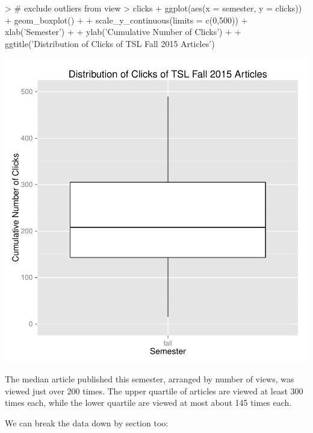 \documentclass[a4paper]{article}
\begin{document}
\begin{Schunk}
\begin{Sinput}
> # exclude outliers from view
> clicks %
+   ggplot(aes(x = semester, y = clicks)) + geom_boxplot() +
+   scale_y_continuous(limits = c(0,500)) + xlab('Semester') +
+   ylab('Cumulative Number of Clicks') +
+   ggtitle('Distribution of Clicks of TSL Fall 2015 Articles')
\end{Sinput}
\end{Schunk}
\includegraphics{FinalProject-025}


The median article published this semester, arranged by number of views, was viewed just over 200 times. The upper quartile of articles are viewed at least 300 times each, while the lower quartile are viewed at most about 145 times each.

We can break the data down by section too:
\end{document}
